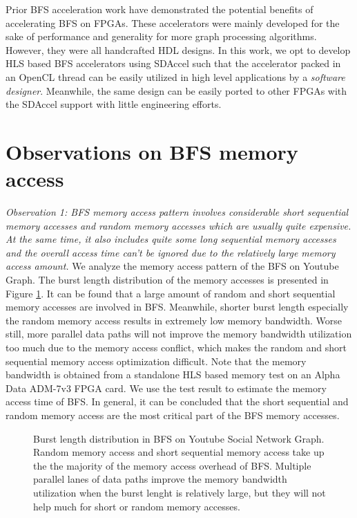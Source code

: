 Prior BFS acceleration work have demonstrated the potential benefits of accelerating 
BFS on FPGAs. These accelerators were mainly developed for the sake 
of performance and generality for more graph processing algorithms. 
However, they were all handcrafted HDL designs. In this work, 
we opt to develop HLS based BFS accelerators 
using SDAccel such that the accelerator packed in an 
OpenCL thread can be easily utilized in high level applications 
by a \textit{software designer}. Meanwhile, the same design can be easily 
ported to other FPGAs with the SDAccel support with little 
engineering efforts.

\section{Observations on BFS memory access} \label{sec:observation}
\textit{Observation 1: BFS memory access pattern  
involves considerable short sequential memory accesses 
and random memory accesses which are usually quite 
expensive. At the same time, it also includes quite some long 
sequential memory accesses and the overall access time can't be 
ignored due to the relatively large memory access amount.} We analyze the 
memory access pattern of the BFS on Youtube Graph. The burst length distribution 
of the memory accesses is presented in Figure \ref{fig:burst-len-youtube}. 
It can be found that a large amount of random and short sequential 
memory accesses are involved in BFS. Meanwhile, shorter burst length especially 
the random memory access results in extremely low memory bandwidth. Worse still, 
more parallel data paths will not improve the memory bandwidth 
utilization too much due to the memory 
access conflict, which makes the random and short sequential 
memory access optimization difficult. Note that the memory bandwidth is obtained 
from a standalone HLS based memory test on an Alpha Data ADM-7v3 FPGA card.
We use the test result to estimate the memory access time of BFS. 
In general, it can be concluded that the short sequential and random 
memory access are the most critical part of the BFS memory accesses. 
 
\begin{figure}
\caption{Burst length distribution in BFS on Youtube Social Network Graph. 
    Random memory access and short sequential memory access take up the 
    the majority of the memory access overhead of BFS. Multiple parallel 
    lanes of data paths improve the memory bandwidth utilization when the 
    burst lenght is relatively large, but they will not help much 
    for short or random memory accesses.}
\label{fig:burst-len-youtube}
\vspace{-1.5em}
\end{figure}

